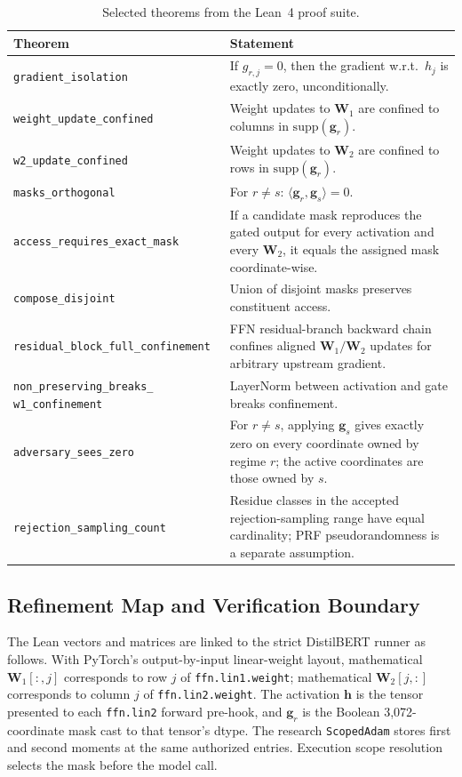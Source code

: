 \documentclass[11pt,a4paper]{article}
\newcommand{\bh}{\mathbf{h}}
\newcommand{\bW}{\mathbf{W}}
\newcommand{\bg}{\mathbf{g}}
\begin{document}
\begin{table}[ht]
\centering
\caption{Selected theorems from the Lean~4 proof suite.}
\label{tab:lean-theorems}
\small
\begin{tabular}{@{}p{5.2cm}p{7.8cm}@{}}
\toprule
\textbf{Theorem} & \textbf{Statement} \\
\midrule
\texttt{gradient\_isolation} &
If $g_{r,j} = 0$, then the gradient w.r.t.\ $h_j$ is
exactly zero, unconditionally. \\
\texttt{weight\_update\_confined} &
Weight updates to $\bW_1$ are confined to columns in
$\mathrm{supp}(\bg_r)$. \\
\texttt{w2\_update\_confined} &
Weight updates to $\bW_2$ are confined to rows in
$\mathrm{supp}(\bg_r)$. \\
\texttt{masks\_orthogonal} &
For $r \neq s$: $\langle \bg_r, \bg_s \rangle = 0$. \\
\texttt{access\_requires\_exact\_mask} &
If a candidate mask reproduces the gated output for every activation
and every $\bW_2$, it equals the assigned mask coordinate-wise. \\
\texttt{compose\_disjoint} &
Union of disjoint masks preserves constituent access. \\
\texttt{residual\_block\_full\_}\allowbreak\texttt{confinement} &
FFN residual-branch backward chain confines aligned
$\bW_1/\bW_2$ updates for arbitrary upstream gradient. \\
\texttt{non\_preserving\_breaks\_}\allowbreak
\texttt{w1\_confinement} &
LayerNorm between activation and gate breaks confinement. \\
\texttt{adversary\_sees\_zero} &
For $r \neq s$, applying $\bg_s$ gives exactly zero on every
coordinate owned by regime $r$; the active coordinates are those
owned by $s$. \\
\texttt{rejection\_sampling\_count} &
Residue classes in the accepted rejection-sampling range have equal
cardinality; PRF pseudorandomness is a separate assumption. \\
\bottomrule
\end{tabular}
\end{table}

\subsection{Refinement Map and Verification Boundary}

The Lean vectors and matrices are linked to the strict DistilBERT
runner as follows.  With PyTorch's output-by-input linear-weight
layout, mathematical $\bW_1[:,j]$ corresponds to row $j$ of
\texttt{ffn.lin1.weight}; mathematical $\bW_2[j,:]$ corresponds to
column $j$ of \texttt{ffn.lin2.weight}.  The activation $\bh$ is the
tensor presented to each \texttt{ffn.lin2} forward pre-hook, and
$\bg_r$ is the Boolean 3,072-coordinate mask cast to that tensor's
dtype.  The research \texttt{ScopedAdam} stores first and second
moments at the same authorized entries.  Execution scope resolution
selects the mask before the model call.
\end{document}
